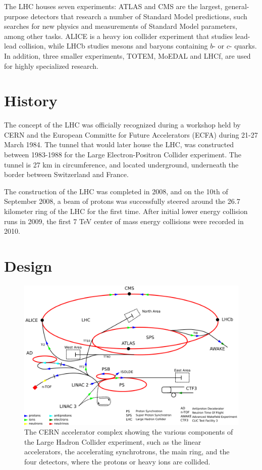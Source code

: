 \documentclass[11pt,a4paper,openright,twoside]{report}
\begin{document}
The LHC houses seven experiments: ATLAS and CMS are the largest, general-purpose detectors that research a number of Standard Model predictions, such searches for new physics and measurements of Standard Model parameters, among other tasks. ALICE is a heavy ion collider experiment that studies lead-lead collision, while LHCb studies mesons and baryons containing $b$- or $c$- quarks. In addition, three smaller experiments, TOTEM, MoEDAL and LHCf, are used for highly specialized research.

\section{History}
The concept of the LHC was officially recognized during a workshop held by CERN and the European Committe for Future Accelerators (ECFA) during 21-27 March 1984. The tunnel that would later house the LHC, was constructed between 1983-1988 for the Large Electron-Positron Collider experiment. The tunnel is 27 km in circumference, and located underground, underneath the border between Switzerland and France.

The construction of the LHC was completed in 2008, and on the 10th of September 2008, a beam of protons was successfully steered around the 26.7 kilometer ring of the LHC for the first time. After initial lower energy collision runs in 2009, the first 7 TeV center of mass energy collisions were recorded in 2010.
\vfill

\section{Design}
\begin{figure}[H]
\centering
	\includegraphics[width=0.9\linewidth]{Cern_accelerator_complex.png}
	\caption{The CERN accelerator complex showing the various components of the Large Hadron Collider experiment, such as the linear accelerators, the accelerating synchrotrons, the main ring, and the four detectors, where the protons or heavy ions are collided.}
		\label{fig:LHCring}
\end{figure}
\end{document}
